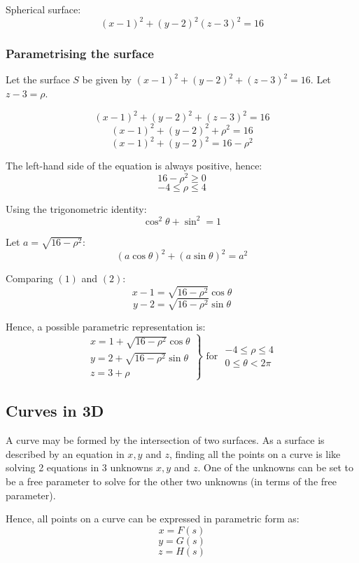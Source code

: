 \documentclass[11pt]{article}
\begin{document}
Spherical surface:
\[(x - 1)^2 + (y - 2)^2 (z - 3)^2 = 16\]

\subsubsection{Parametrising the surface}
\label{sec:orgf36d433}
Let the surface \(S\) be given by \((x - 1)^2 + (y - 2)^2 + (z - 3)^2 = 16\). Let \(z - 3 = \rho\).

\[(x - 1)^2 + (y - 2)^2 + (z - 3)^2 = 16\]
\[(x - 1)^2 + (y - 2)^2 + \rho^2 = 16\]
\[(x - 1)^2 + (y - 2)^2 = 16 - \rho^2 \tag{1}\]

The left-hand side of the equation is always positive, hence:
\[16 - \rho^2 \ge 0\]
\[-4 \le \rho \le 4\]

Using the trigonometric identity:
\[\cos^2 \theta + \sin^2 = 1\]

Let \(a = \sqrt{16 - \rho^2}\):
\[(a \cos \theta)^2 + (a \sin \theta)^2 = a^2 \tag{2}\]

Comparing \((1)\) and \((2)\):
\[x - 1 = \sqrt{16 - \rho^2} \cos \theta\]
\[y - 2 = \sqrt{16 - \rho^2} \sin \theta\]

Hence, a possible parametric representation is:
\begin{displaymath}
\left. \begin{array}{l}
x = 1 + \sqrt{16 - \rho^2} \cos \theta \\
y = 2 + \sqrt{16 - \rho^2} \sin \theta \\
z = 3 + \rho
\end{array} \right\} \text{ for } \begin{array}{c}
-4 \le \rho \le 4 \\
0 \le \theta < 2 \pi
\end{array}
\end{displaymath}

\subsection{Curves in 3D}
\label{sec:orgac6b9f6}
A curve may be formed by the intersection of two surfaces.
As a surface is described by an equation in \(x, y\) and \(z\), finding all the points on a curve is like solving 2 equations in 3 unknowns \(x, y\) and \(z\).
One of the unknowns can be set to be a free parameter to solve for the other two unknowns (in terms of the free parameter).

Hence, all points on a curve can be expressed in parametric form as:
\[x = F(s)\]
\[y = G(s)\]
\[z = H(s)\]
\end{document}
